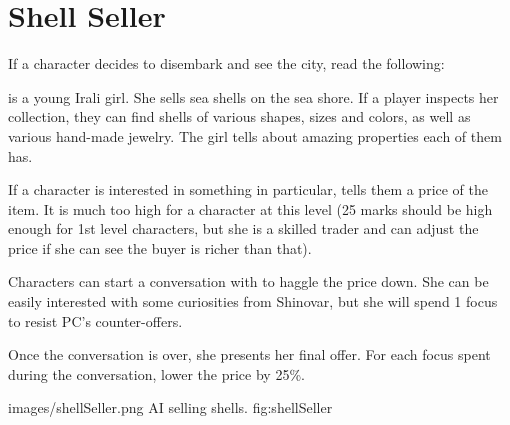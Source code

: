 \section{Shell Seller}

If a character decides to disembark and see the city, read the following:


\npcShellSeller[s] is a young Irali girl. She sells sea shells on the sea shore. If a player inspects her collection, they can find shells of various shapes, sizes and colors, as well as various hand-made jewelry. The girl tells about amazing properties each of them has.

If a character is interested in something in particular, \npcShellSeller{} tells them a price of the item. It is much too high for a character at this level (25 marks should be high enough for 1st level characters, but she is a skilled trader and can adjust the price if she can see the buyer is richer than that).

Characters can start a conversation with \npcShellSeller{} to haggle the price down.
She can be easily interested with some curiosities from Shinovar, but she will spend 1 focus to resist PC's counter-offers.

Once the conversation is over, she presents her final offer. For each focus \npcShellSeller{} spent during the conversation, lower the price by 25\%.


					{images/shellSeller.png}
					{AI}
					{\npcShellSeller{} selling shells.}
					{fig:shellSeller}
